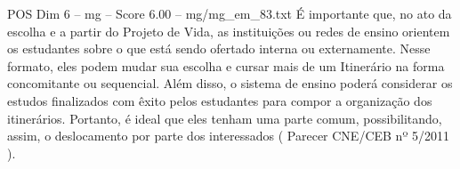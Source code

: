 \begin{textsample}{POS Dim 6 – mg – Score 6.00 – mg/mg\_em\_83.txt}
É importante que, no ato da escolha e a partir do Projeto de Vida, as instituições ou redes de ensino orientem os estudantes sobre o que está sendo ofertado interna ou externamente.
Nesse formato, eles podem mudar sua escolha e cursar mais de um Itinerário na forma concomitante ou sequencial.
Além disso, o sistema de ensino poderá considerar os estudos finalizados com êxito pelos estudantes para compor a organização dos itinerários.
Portanto, é ideal que eles tenham uma parte comum, possibilitando, assim, o deslocamento por parte dos interessados ( Parecer CNE/CEB nº 5/2011 ).

\end{textsample}
